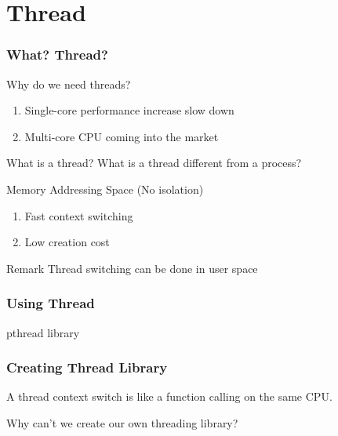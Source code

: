\section{Thread}

\begin{frame}
    \frametitle{What? Thread?}
    Why do we need threads?
    \begin{enumerate}
        \item Single-core performance increase slow down
        \item Multi-core CPU coming into the market
    \end{enumerate}

    What is a thread? What is a thread different from a process?

    Memory Addressing Space (No isolation)
    \begin{enumerate}
        \item Fast context switching
        \item Low creation cost
    \end{enumerate}

    \vspace{2em}

    \begin{alertblock}{Remark}
        Thread switching can be done in user space
    \end{alertblock}
\end{frame}


\begin{frame}
    \frametitle{Using Thread}
    pthread library
\end{frame}

\begin{frame}
    \frametitle{Creating Thread Library}
    A thread context switch is like a function calling on the same CPU.

    Why can't we create our own threading library?
\end{frame}

